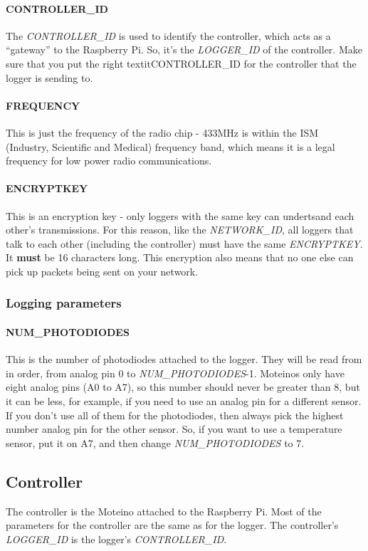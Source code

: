 \documentclass[10pt]{article}
\begin{document}
\paragraph{CONTROLLER\_ID}
The \textit{CONTROLLER\_ID} is used to identify the controller, which acts as a ``gateway'' to the Raspberry Pi. So, it's the \textit{LOGGER\_ID} of the controller. Make
sure that you put the right textit{CONTROLLER\_ID} for the controller that the logger is sending to.

\paragraph{FREQUENCY}
This is just the frequency of the radio chip - 433MHz is within the ISM (Industry, Scientific and Medical) frequency band, which means it is a legal frequency for low power radio communications.

\paragraph{ENCRYPTKEY}
This is an encryption key - only loggers with the same key can undertsand each other's transmissions. For this reason, like the \textit{NETWORK\_ID}, all loggers that
talk to each other (including the controller) must have the same \textit{ENCRYPTKEY}. It \textbf{must} be 16 characters long. This encryption also means that no one
else can pick up packets being sent on your network.

\subsubsection{Logging parameters}

\paragraph{NUM\_PHOTODIODES}
This is the number of photodiodes attached to the logger. They will be read from in order, from analog pin 0 to \textit{NUM\_PHOTODIODES}-1. Moteinos only have eight analog pins (A0 to A7), so this number should never be greater than 8, but it can be less, for example, if you need to use an analog pin for a different sensor. If you don't use all of them for the photodiodes, then always pick the highest number analog pin for the other sensor. So, if you want to use a temperature sensor, put it on A7, and then change \textit{NUM\_PHOTODIODES} to 7.

\subsection{Controller}
The controller is the Moteino attached to the Raspberry Pi. Most of the parameters for the controller are the same as for the logger. The controller's \textit{LOGGER\_ID} is the logger's \textit{CONTROLLER\_ID}. 
\end{document}
